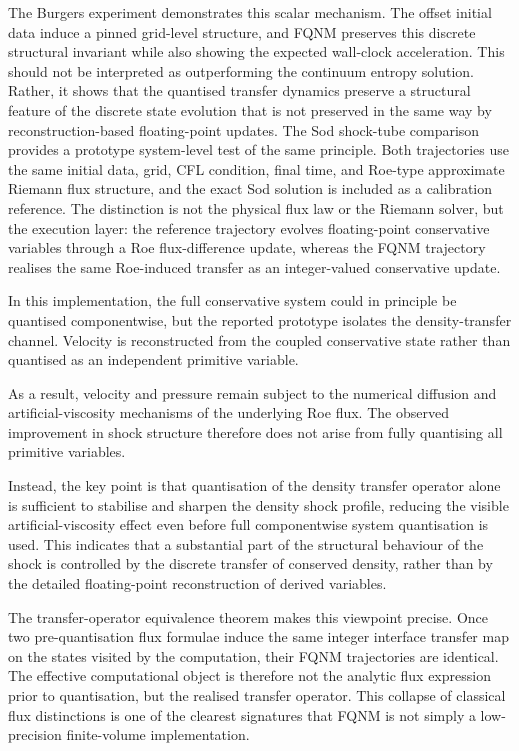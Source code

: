 \documentclass[sn-basic]{sn-jnl}
\theoremstyle{plain}
\theoremstyle{remark}
\begin{document}
The Burgers experiment demonstrates this scalar mechanism. The offset initial data induce a pinned grid-level structure, and FQNM preserves this discrete structural invariant while also showing the expected wall-clock acceleration. This should not be interpreted as outperforming the continuum entropy solution. Rather, it shows that the quantised transfer dynamics preserve a structural feature of the discrete state evolution that is not preserved in the same way by reconstruction-based floating-point updates.
The Sod shock-tube comparison provides a prototype system-level test of the same principle. Both trajectories use the same initial data, grid, CFL condition, final time, and Roe-type approximate Riemann flux structure, and the exact Sod solution is included as a calibration reference. The distinction is not the physical flux law or the Riemann solver, but the execution layer: the reference trajectory evolves floating-point conservative variables through a Roe flux-difference update, whereas the FQNM trajectory realises the same Roe-induced transfer as an integer-valued conservative update.

In this implementation, the full conservative system could in principle be quantised componentwise, but the reported prototype isolates the density-transfer channel. Velocity is reconstructed from the coupled conservative state rather than quantised as an independent primitive variable.

As a result, velocity and pressure remain subject to the numerical diffusion and artificial-viscosity mechanisms of the underlying Roe flux. The observed improvement in shock structure therefore does not arise from fully quantising all primitive variables.

Instead, the key point is that quantisation of the density transfer operator alone is sufficient to stabilise and sharpen the density shock profile, reducing the visible artificial-viscosity effect even before full componentwise system quantisation is used. This indicates that a substantial part of the structural behaviour of the shock is controlled by the discrete transfer of conserved density, rather than by the detailed floating-point reconstruction of derived variables.

The transfer-operator equivalence theorem makes this viewpoint precise. Once two pre-quantisation flux formulae induce the same integer interface transfer map on the states visited by the computation, their FQNM trajectories are identical. The effective computational object is therefore not the analytic flux expression prior to quantisation, but the realised transfer operator. This collapse of classical flux distinctions is one of the clearest signatures that FQNM is not simply a low-precision finite-volume implementation.
\end{document}
